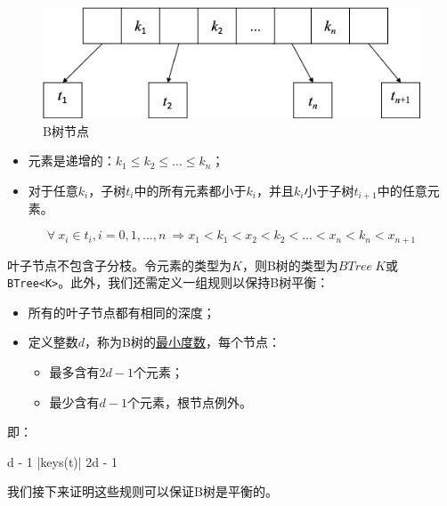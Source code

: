 \documentclass{ctexart}
\begin{document}
\begin{figure}[htbp]
  \centering
  \includegraphics[scale=0.5]{img/btree-node.png}
  \caption{B树节点}
  \label{fig:btree-node}
\end{figure}

\begin{itemize}
\item 元素是递增的：$k_1 \leq k_2 \leq ... \leq k_n$；
\item 对于任意$k_i$，子树$t_i$中的所有元素都小于$k_i$，并且$k_i$小于子树$t_{i+1}$中的任意元素。
\end{itemize}

\begin{equation}
\forall\ x_i \in t_i, i=0, 1, ..., n\ \Rightarrow x_1 < k_1 < x_2 < k_2 < ... < x_n < k_n < x_{n+1}
\label{eq:btree-order}
\end{equation}

叶子节点不包含子分枝。令元素的类型为$K$，则B树的类型为$BTree\ K$或\texttt{BTree<K>}。此外，我们还需定义一组规则以保持B树平衡：

\begin{itemize}
\item 所有的叶子节点都有相同的深度；
\item 定义整数$d$，称为B树的\underline{最小度数}，每个节点：
    \begin{itemize}
        \item 最多含有$2d - 1$个元素；
        \item 最少含有$d - 1$个元素，根节点例外。
    \end{itemize}
\end{itemize}

即：

\be
  d - 1 \leq |keys(t)|  \leq 2d - 1
\ee

我们接下来证明这些规则可以保证B树是平衡的。
\end{document}
